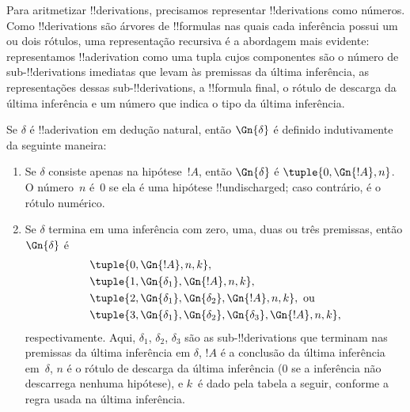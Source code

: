 \documentclass[../../../include/open-logic-section]{subfiles}
\begin{document}

\begin{explain}
Para aritmetizar !!{derivation}s, precisamos representar
!!{derivation}s como
números. Como !!{derivation}s são árvores de !!{formula}s nas quais
cada inferência possui um ou dois rótulos, uma representação recursiva
é a abordagem mais evidente: representamos !!a{derivation} como uma
tupla cujos componentes são o número de sub-!!{derivation}s imediatas
que levam às premissas da última inferência, as representações dessas
sub-!!{derivation}s, a !!{formula} final, o rótulo de descarga da última
inferência e um número que indica o tipo da última inferência.
\end{explain}

\begin{defn}
  Se $\delta$ é !!a{derivation} em dedução natural, então $\Gn{\delta}$
  é definido indutivamente da seguinte maneira:
  \begin{enumerate}
  \item 
    Se $\delta$ consiste apenas na hipótese~$!A$, então $\Gn{\delta}$ é
    $\tuple{0, \Gn{!A}, n}$. O número~$n$ é~$0$ se ela é uma hipótese
    !!{undischarged}; caso contrário, é o rótulo numérico.
  \item 
    Se $\delta$ termina em uma inferência com zero, uma, duas ou três
    premissas, então $\Gn{\delta}$ é
    \begin{align*}
      & \tuple{0, \Gn{!A}, n, k}, \\
      & \tuple{1, \Gn{\delta_1}, \Gn{!A}, n, k}, \\
      & \tuple{2, \Gn{\delta_1}, \Gn{\delta_2}, \Gn{!A}, n, k}, \text{ ou}\\
      & \tuple{3, \Gn{\delta_1}, \Gn{\delta_2}, \Gn{\delta_3}, \Gn{!A}, n,
        k},
    \end{align*}
    respectivamente. Aqui, $\delta_1$, $\delta_2$, $\delta_3$ são as
    sub-!!{derivation}s que terminam nas premissas da última inferência
    em $\delta$, $!A$ é a conclusão da última inferência em~$\delta$,
    $n$ é o rótulo de descarga da última inferência ($0$ se a inferência
    não descarrega nenhuma hipótese), e $k$~é dado pela tabela a seguir,
    conforme a regra usada na última inferência.
  

\end{enumerate}
\end{defn}
\end{document}
